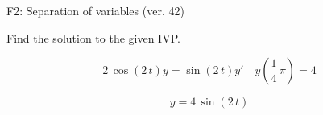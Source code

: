 \begin{exercise}
  \begin{exerciseTitle}F2: Separation of variables (ver. 42)\end{exerciseTitle}
  \begin{exerciseStatement}
    
Find the solution to the given IVP.

    
\[2 \, \cos\left(2 \, t\right) y= \sin\left(2 \, t\right) y'\hspace{1em} y\left( \frac{1}{4} \, \pi \right)= 4\]

  \end{exerciseStatement}
  \begin{exerciseAnswer}
    
\[y= 4 \, \sin\left(2 \, t\right)\]

  \end{exerciseAnswer}
\end{exercise}